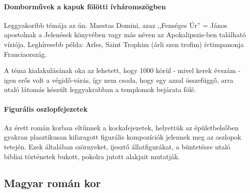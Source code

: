 		\paragraph{Domborművek a kapuk fölötti ívháromszögben}
		Leggyakoribb témája az ún. Maestas Domini, azaz ,,Fenséges Úr” = János apostolnak a Jelenések könyvében vagy más néven az Apokalipszis-ben található víziója. Leghíresebb példa:
		Arles, Saint Trophim (árli szen trofim) ívtimpanonja Franciaország.
		
		A téma kialakulásának oka az lehetett, hogy 1000 körül - mivel kerek évszám - igen erős volt a végidő-várás, így nem csoda, hogy egy azzal összefüggő, arra utaló látomás készült leggyakrabban a templomok bejárata fölé.
		
		\paragraph{Figurális oszlopfejezetek}
		Az érett román korban eltűnnek a kockafejezetek, helyettük az épületbelsőben gyakran plasztikusan kifaragott figurális kompozíciók jelennek meg az oszlopok tetején. Ezek általában szörnyeket, ijesztő állatfigurákat, a büntetésre utaló bibliai történetek bukott, pokolra jutott alakjait mutatják.
		
	\clearpage
	
	\subsection*{Magyar román kor}
	
	\begin{figure}[H]
		\centering
		\begin{minipage}{0.47\textwidth}
		\end{minipage}
		\hfill
		\begin{minipage}{0.47\textwidth}
			
		\end{minipage}
	

		\begin{minipage}{0.7\textwidth}
			
		\end{minipage}
	\end{figure}
	
